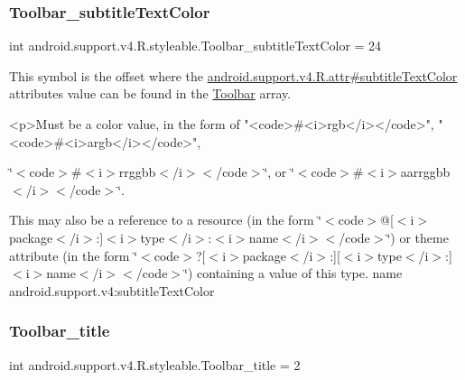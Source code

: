 \subsubsection{\texorpdfstring{Toolbar\+\_\+subtitle\+Text\+Color}{Toolbar\_subtitleTextColor}}
{\footnotesize\ttfamily int android.\+support.\+v4.\+R.\+styleable.\+Toolbar\+\_\+subtitle\+Text\+Color = 24\hspace{0.3cm}{\ttfamily [static]}}

This symbol is the offset where the \hyperlink{classandroid_1_1support_1_1v4_1_1R_1_1attr_a3a89f0ff3e533851db757c20a54dae88}{android.\+support.\+v4.\+R.\+attr\#subtitle\+Text\+Color} attribute\textquotesingle{}s value can be found in the \hyperlink{classandroid_1_1support_1_1v4_1_1R_1_1styleable_a211358a2f951023c7735caea0fb5ae04}{Toolbar} array.

\begin{DoxyVerb}      <p>Must be a color value, in the form of "<code>#<i>rgb</i></code>", "<code>#<i>argb</i></code>",
\end{DoxyVerb}
 \char`\"{}$<$code$>$\#$<$i$>$rrggbb$<$/i$>$$<$/code$>$\char`\"{}, or \char`\"{}$<$code$>$\#$<$i$>$aarrggbb$<$/i$>$$<$/code$>$\char`\"{}. 

This may also be a reference to a resource (in the form \char`\"{}$<$code$>$@\mbox{[}$<$i$>$package$<$/i$>$\+:\mbox{]}$<$i$>$type$<$/i$>$\+:$<$i$>$name$<$/i$>$$<$/code$>$\char`\"{}) or theme attribute (in the form \char`\"{}$<$code$>$?\mbox{[}$<$i$>$package$<$/i$>$\+:\mbox{]}\mbox{[}$<$i$>$type$<$/i$>$\+:\mbox{]}$<$i$>$name$<$/i$>$$<$/code$>$\char`\"{}) containing a value of this type.  name android.\+support.\+v4\+:subtitle\+Text\+Color \mbox{\label{classandroid_1_1support_1_1v4_1_1R_1_1styleable_a028dd183d392a34cc1188283e78f799d}} 
\subsubsection{\texorpdfstring{Toolbar\+\_\+title}{Toolbar\_title}}
{\footnotesize\ttfamily int android.\+support.\+v4.\+R.\+styleable.\+Toolbar\+\_\+title = 2\hspace{0.3cm}{\ttfamily [static]}}

